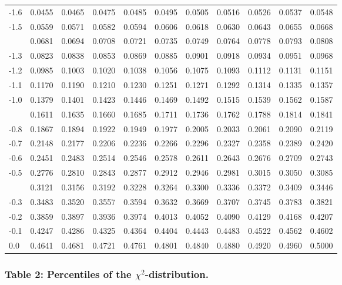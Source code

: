 \documentclass[
]{article}
\begin{document}
\begin{longtable}[t]{lrrrrrrrrrr}
-1.6 & 0.0455 & 0.0465 & 0.0475 & 0.0485 & 0.0495 & 0.0505 & 0.0516 & 0.0526 & 0.0537 & 0.0548\\
-1.5 & 0.0559 & 0.0571 & 0.0582 & 0.0594 & 0.0606 & 0.0618 & 0.0630 & 0.0643 & 0.0655 & 0.0668\\
\addlinespace
-1.4 & 0.0681 & 0.0694 & 0.0708 & 0.0721 & 0.0735 & 0.0749 & 0.0764 & 0.0778 & 0.0793 & 0.0808\\
-1.3 & 0.0823 & 0.0838 & 0.0853 & 0.0869 & 0.0885 & 0.0901 & 0.0918 & 0.0934 & 0.0951 & 0.0968\\
-1.2 & 0.0985 & 0.1003 & 0.1020 & 0.1038 & 0.1056 & 0.1075 & 0.1093 & 0.1112 & 0.1131 & 0.1151\\
-1.1 & 0.1170 & 0.1190 & 0.1210 & 0.1230 & 0.1251 & 0.1271 & 0.1292 & 0.1314 & 0.1335 & 0.1357\\
-1.0 & 0.1379 & 0.1401 & 0.1423 & 0.1446 & 0.1469 & 0.1492 & 0.1515 & 0.1539 & 0.1562 & 0.1587\\
\addlinespace
-0.9 & 0.1611 & 0.1635 & 0.1660 & 0.1685 & 0.1711 & 0.1736 & 0.1762 & 0.1788 & 0.1814 & 0.1841\\
-0.8 & 0.1867 & 0.1894 & 0.1922 & 0.1949 & 0.1977 & 0.2005 & 0.2033 & 0.2061 & 0.2090 & 0.2119\\
-0.7 & 0.2148 & 0.2177 & 0.2206 & 0.2236 & 0.2266 & 0.2296 & 0.2327 & 0.2358 & 0.2389 & 0.2420\\
-0.6 & 0.2451 & 0.2483 & 0.2514 & 0.2546 & 0.2578 & 0.2611 & 0.2643 & 0.2676 & 0.2709 & 0.2743\\
-0.5 & 0.2776 & 0.2810 & 0.2843 & 0.2877 & 0.2912 & 0.2946 & 0.2981 & 0.3015 & 0.3050 & 0.3085\\
\addlinespace
-0.4 & 0.3121 & 0.3156 & 0.3192 & 0.3228 & 0.3264 & 0.3300 & 0.3336 & 0.3372 & 0.3409 & 0.3446\\
-0.3 & 0.3483 & 0.3520 & 0.3557 & 0.3594 & 0.3632 & 0.3669 & 0.3707 & 0.3745 & 0.3783 & 0.3821\\
-0.2 & 0.3859 & 0.3897 & 0.3936 & 0.3974 & 0.4013 & 0.4052 & 0.4090 & 0.4129 & 0.4168 & 0.4207\\
-0.1 & 0.4247 & 0.4286 & 0.4325 & 0.4364 & 0.4404 & 0.4443 & 0.4483 & 0.4522 & 0.4562 & 0.4602\\
0.0 & 0.4641 & 0.4681 & 0.4721 & 0.4761 & 0.4801 & 0.4840 & 0.4880 & 0.4920 & 0.4960 & 0.5000\\
\bottomrule
\end{longtable}

\newpage

\subsubsection{\texorpdfstring{Table 2: Percentiles of the
\(\chi^2\)-distribution.}{Table 2: Percentiles of the \textbackslash chi\^{}2-distribution.}}\label{table-2-percentiles-of-the-chi2-distribution.}
\end{document}
